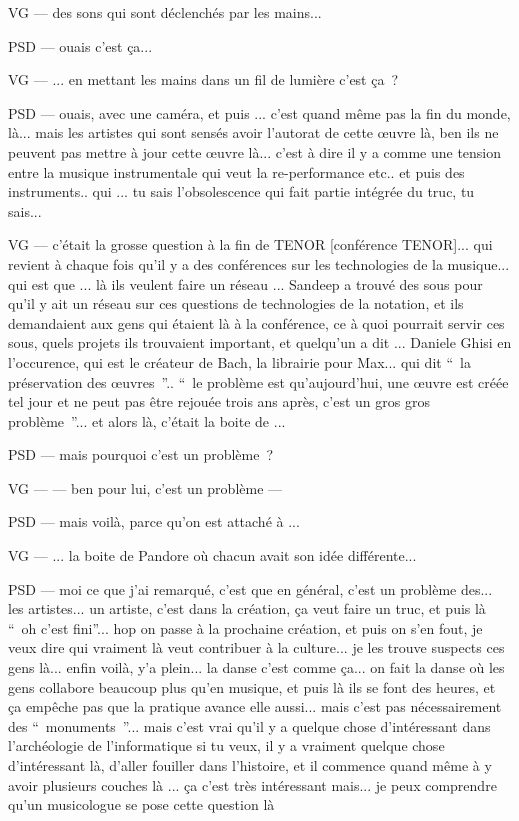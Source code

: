 VG — des sons qui sont déclenchés par les mains... 

PSD — ouais c'est ça... 

VG — ... en mettant les mains dans un fil de lumière c'est ça ? 

PSD — ouais, avec une caméra, et puis ... c'est quand même pas la fin du monde, là... mais les artistes qui sont sensés avoir l'autorat de cette œuvre là, ben ils ne peuvent pas mettre à jour cette œuvre là... c'est à dire il y a comme une tension entre la musique instrumentale qui veut la re-performance etc.. et puis des instruments.. qui ... tu sais l'obsolescence qui fait partie intégrée du truc, tu sais... 

VG — c'était la grosse question à la fin de TENOR [conférence TENOR]... qui revient à chaque fois qu'il y a des conférences sur les technologies de la musique... qui est que ... là ils veulent faire un réseau ... Sandeep a trouvé des sous pour qu'il y ait un réseau sur ces questions de technologies de la notation, et ils demandaient aux gens qui étaient là à la conférence, ce à quoi pourrait servir ces sous, quels projets ils trouvaient important, et quelqu'un a dit ... Daniele Ghisi en l'occurence, qui est le créateur de Bach, la librairie pour Max... qui dit “ la préservation des œuvres ”.. “ le problème est qu'aujourd'hui, une œuvre est créée tel jour et ne peut pas être rejouée trois ans après, c'est un gros gros problème ”... et alors là, c'était la boite de ... 

PSD — mais pourquoi c'est un problème ? 

VG — — ben pour lui, c'est un problème — 

PSD — mais voilà, parce qu'on est attaché à ... 

VG — ... la boite de Pandore où chacun avait son idée différente... 

PSD — moi ce que j'ai remarqué, c'est que en général, c'est un problème des... les artistes... un artiste, c'est dans la création, ça veut faire un truc, et puis là “ oh c'est fini”... hop on passe à la prochaine création, et puis on s'en fout, je veux dire qui vraiment là veut contribuer à la culture... je les trouve suspects ces gens là... enfin voilà, y'a plein... la danse c'est comme ça... on fait la danse où les gens collabore beaucoup plus qu'en musique, et puis là ils se font des heures, et ça empêche pas que la pratique avance elle aussi... mais c'est pas nécessairement des “ monuments ”... mais c'est vrai qu'il y a quelque chose d'intéressant dans l'archéologie de l'informatique si tu veux, il y a vraiment quelque chose d'intéressant là, d'aller fouiller dans l'histoire, et il commence quand même à y avoir plusieurs couches là ... ça c'est très intéressant mais... je peux comprendre qu'un musicologue se pose cette question là 

